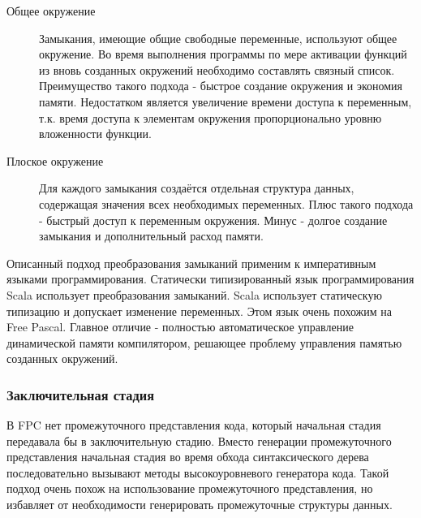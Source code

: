 \documentclass{imcs}
\begin{document}
\begin{description}
    \item[Общее окружение] Замыкания, имеющие общие свободные переменные,
используют общее окружение. Во время выполнения программы по мере активации функций
из вновь созданных окружений необходимо составлять связный список.
Преимущество такого подхода - быстрое создание окружения и экономия памяти. Недостатком
является увеличение времени доступа к переменным, т.к. время доступа к элементам
окружения пропорционально уровню вложенности функции.
    \item[Плоское окружение] Для каждого замыкания создаётся отдельная структура данных,
содержащая значения всех необходимых переменных. Плюс такого подхода - быстрый доступ
к переменным окружения. Минус - долгое создание замыкания и дополнительный расход памяти.
\end{description}

Описанный подход преобразования замыканий применим к императивным языками
программирования. Статически типизированный язык программирования Scala
использует преобразования замыканий\cite{scalaoverview}\cite{scalaclosure}.
Scala использует статическую типизацию и допускает изменение переменных. Этом
язык очень похожим на Free Pascal. Главное отличие - полностью автоматическое
управление динамической памяти компилятором, решающее проблему управления памятью
созданных окружений.

\subsubsection{Заключительная стадия}

В FPC нет промежуточного представления кода, который начальная стадия
передавала бы в заключительную стадию. Вместо генерации промежуточного представления
начальная стадия во время обхода синтаксического дерева последовательно вызывают методы
высокоуровневого генератора кода. Такой подход очень похож на использование
промежуточного представления, но избавляет от необходимости генерировать промежуточные
структуры данных.

\end{document}
